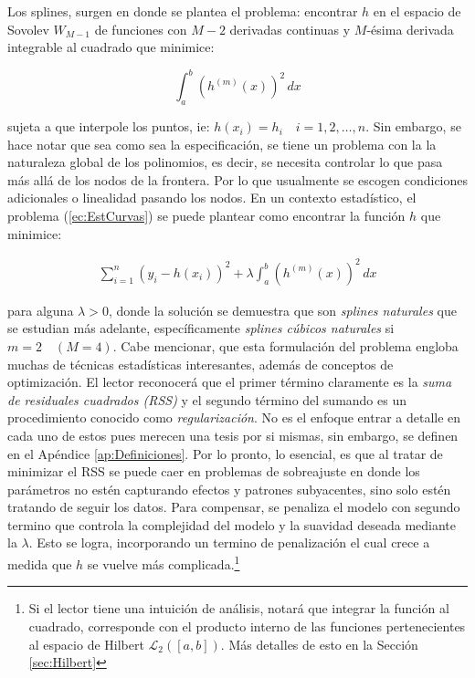 \documentclass[../Main/Main.tex]{subfiles}
\begin{document}
Los splines, surgen en \autocite{schoenberg1964spline} donde se plantea el problema: encontrar $h$ en el espacio de Sovolev $W_{M-1}$ de funciones con $M-2$ derivadas continuas y $M$-ésima derivada integrable al cuadrado que minimice:

$$\int_a^b(h^{(m)}(x))^2\,dx$$ 

sujeta a que interpole los puntos, ie: $h(x_i) = h_i \quad i = 1,2,\ldots,n$. Sin embargo, se hace notar que sea como sea la especificación, se tiene un problema con la la naturaleza global de los polinomios, es decir, se necesita controlar lo que pasa más allá de los nodos de la frontera. Por lo que usualmente se escogen condiciones adicionales o linealidad pasando los nodos. En un contexto estadístico, el problema (\ref{ec:EstCurvas}) se puede plantear como encontrar la función $h$ que minimice:

\begin{align}
	\sum_{i=1}^n(y_i - h(x_i))^2 + \lambda\int_a^b (h^{(m)}(x))^2 \, dx \label{ec:SplinesConRegularizacion}
\end{align}

para alguna $\lambda > 0$, donde la solución se demuestra que son \textit{splines naturales} que se estudian más adelante, específicamente \textit{splines cúbicos naturales} si $m = 2\quad (M = 4)$. Cabe mencionar, que esta formulación del problema engloba muchas de técnicas estadísticas interesantes, además de conceptos de optimización. El lector reconocerá que el primer término claramente es la \textit{suma de residuales cuadrados (RSS)} y el segundo término del sumando es un procedimiento conocido como \textit{regularización}. No es el enfoque entrar a detalle en cada uno de estos pues merecen una tesis por si mismas, sin embargo, se definen en el Apéndice \ref{ap:Definiciones}. Por lo pronto, lo esencial, es que al tratar de minimizar el RSS se puede caer en problemas de sobreajuste en donde los parámetros no estén capturando efectos y patrones subyacentes, sino solo estén tratando de seguir los datos. Para compensar, se penaliza el modelo con segundo termino que controla la complejidad del modelo y la suavidad deseada mediante la $\lambda$. Esto se logra, incorporando un termino de penalización el cual crece a medida que $h$ se vuelve más complicada.\footnote{Si el lector tiene una intuición de análisis, notará que integrar la función al cuadrado, corresponde con el producto interno de las funciones pertenecientes al espacio de Hilbert $\mathcal{L}_2([a,b])$. Más detalles de esto en la Sección \ref{sec:Hilbert}} \\
\end{document}
